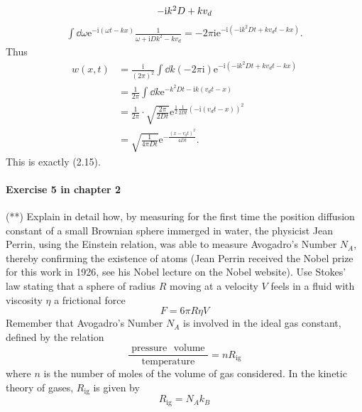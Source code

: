 \documentclass[hyperref, a4paper]{article}
\newcommand*{\ii}{\mathrm{i}}
\newcommand*{\ee}{\mathrm{e}}
\begin{document}
\begin{itemize}
\[\begin{tikzpicture}[x=0.75pt,y=0.75pt,yscale=-1,xscale=1]
        \draw (250,144.4) node [anchor=north west][inner sep=0.75pt]    {$-\ii k^{2} D+kv_{d}$};
        
        
        \end{tikzpicture}    
\]
\[
    \begin{aligned}
        \int \dd{\omega} \ee^{- \ii (\omega t - k x)} \frac{1}{\omega + \ii D k^2 - k v_d} = - 2\pi \ii \ee^{- \ii ( - \ii k^2 D t + k v_d t - kx )}.
    \end{aligned}
\]
Thus 
\[
    \begin{aligned}
        w(x, t) &= \frac{\ii}{(2\pi)^2} \int \dd{k} (- 2\pi \ii) \ee^{- \ii ( - \ii k^2 D t + k v_d t - kx )} \\
        &= \frac{1}{2\pi} \int \dd{k} \ee^{- k^2 D t - \ii k (v_d t - x)} \\
        &= \frac{1}{2\pi} \cdot \sqrt{\frac{2\pi}{2 D t}} \ee^{\frac{1}{2} \frac{1}{2 D t} (- \ii (v_d t - x))^2} \\
        &= \sqrt{\frac{1}{4 \pi D t}} \ee^{- \frac{(x - v_d t)^2}{4 D t}} .
    \end{aligned}
\]
This is exactly (2.15).

\end{itemize}

\paragraph{Exercise 5 in chapter 2} (**) Explain in detail how, by measuring for the first time the position diffusion constant of a small Brownian sphere immerged in water, the physicist Jean Perrin, using the Einstein relation, was able to measure Avogadro's Number $N_A$, thereby confirming the existence of atoms (Jean Perrin received the Nobel prize for this work in 1926, see his Nobel lecture on the Nobel website). Use Stokes' law stating that a sphere of radius $R$ moving at a velocity $V$ feels in a fluid with viscosity $\eta$ a frictional force
$$
F=6 \pi R \eta V
$$
Remember that Avogadro's Number $N_A$ is involved in the ideal gas constant, defined by the relation
$$
\frac{\text { pressure } \text { volume }}{\text { temperature }}=n R_{\mathrm{ig}}
$$
where $n$ is the number of moles of the volume of gas considered. In the kinetic theory of gases, $R_{\mathrm{ig}}$ is given by
$$
R_{\mathrm{ig}}=N_A k_B
$$
\end{document}
